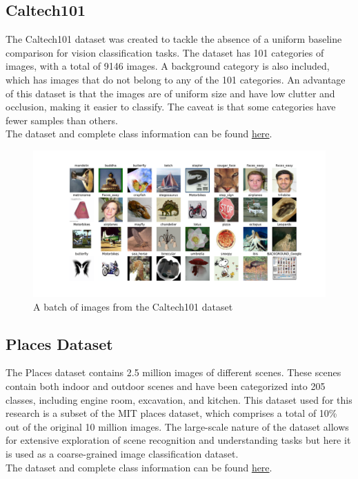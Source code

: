 \subsection{Caltech101}
The Caltech101 \cite{liCaltech101} dataset was created to tackle the absence of a uniform baseline comparison for vision classification tasks. The dataset has 101 categories of images, with a total of 9146 images. A background category is also included, which has images that do not belong to any of the 101 categories. An advantage of this dataset is that the images are of uniform size and have low clutter and occlusion, making it easier to classify. The caveat is that some categories have fewer samples than others.\\
The dataset and complete class information can be found \href{https://www.kaggle.com/datasets/862ae86edba271c39f76d0b530edeb55076b4b82b971160637210900747c44b1}{here}.
\begin{figure}[H]
    \centering
    \includegraphics[width=1\textwidth]{images/caltech101.pdf}
    \caption{A batch of images from the Caltech101 dataset}
    \label{fig:calt}
\end{figure}

\subsection{Places Dataset}
The Places dataset \cite{zhouPlaces10Million2018} contains 2.5 million images of different scenes. These scenes contain both indoor and outdoor scenes and have been categorized into 205 classes, including engine room, excavation, and kitchen. This dataset used for this research is a subset of the MIT places dataset, which comprises a total of 10\% out of the original 10 million images. The large-scale nature of the dataset allows for extensive exploration of scene recognition and understanding tasks but here it is used as a coarse-grained image classification dataset.\\
The dataset and complete class information can be found \href{https://www.kaggle.com/datasets/mittalshubham/images256}{here}.


